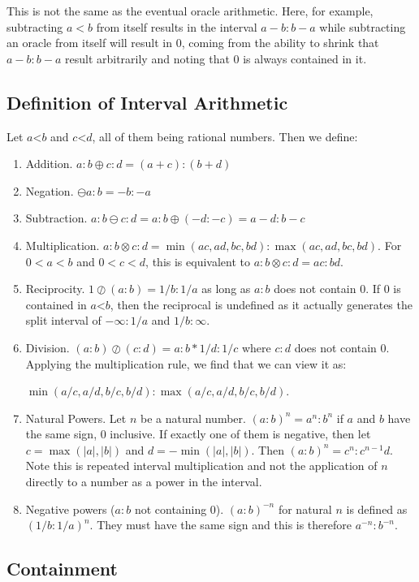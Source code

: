 \documentclass[12pt]{article}
\theoremstyle{remark}
\newcommand{\lt}{\mathord{<}}
\begin{document}
This is not the same as the eventual oracle arithmetic. Here, for example, subtracting $a<b$ from itself results in the interval $a-b:b-a$ while subtracting an oracle from itself will result in $0$, coming from the ability to shrink that $a-b:b-a$ result arbitrarily and noting that $0$ is always contained in it. 

\subsection{Definition of Interval Arithmetic}

Let $a \lt b$ and $c \lt d$, all of them being rational numbers. Then we define:
\begin{enumerate}
    \item Addition. $a:b \oplus c:d = (a+c):(b+d)$
    \item Negation. $\ominus a:b = -b:-a$
    \item Subtraction. $a:b \ominus c:d = a:b \oplus (-d:-c) = a-d:b-c$
    \item Multiplication. $a:b \otimes c:d = \min(ac, ad, bc, bd): \max(ac,ad,bc,bd)$. For $0<a<b$ and $0<c<d$, this is equivalent to $a:b \otimes c:d = ac:bd$. 
    \item Reciprocity. $1 \oslash (a:b) = 1/b:1/a$ as long as $a:b$ does not contain 0. If 0 is contained in $a \lt b$, then the reciprocal is undefined as it actually generates the split interval of $-\infty:1/a$ and $1/b:\infty$. 
    \item Division. $(a:b) \oslash (c:d) = a:b * 1/d:1/c$ where $c:d$ does not contain 0. Applying the multiplication rule, we find that we can view it as:
    
    $\min(a/c, a/d, b/c, b/d): \max(a/c,a/d,b/c,b/d)$. 
    \item Natural Powers. Let $n$ be a natural number. $(a:b)^n = a^n:b^n$ if $a$ and $b$ have the same sign, 0 inclusive. If exactly one of them is negative, then let $c = \max (|a|, |b|)$ and $d=-\min(|a|, |b|)$. Then $(a:b)^n = c^n: c^{n-1}d $. Note this is repeated interval multiplication and not the application of $n$ directly to a number as a power in the interval. 
    \item Negative powers ($a:b$ not containing 0). $(a:b)^{-n}$ for natural $n$ is defined as $(1/b:1/a)^n$. They must have the same sign and this is therefore $a^{-n} : b^{-n}$.
\end{enumerate}

\subsection{Containment}\label{containment}
\end{document}
